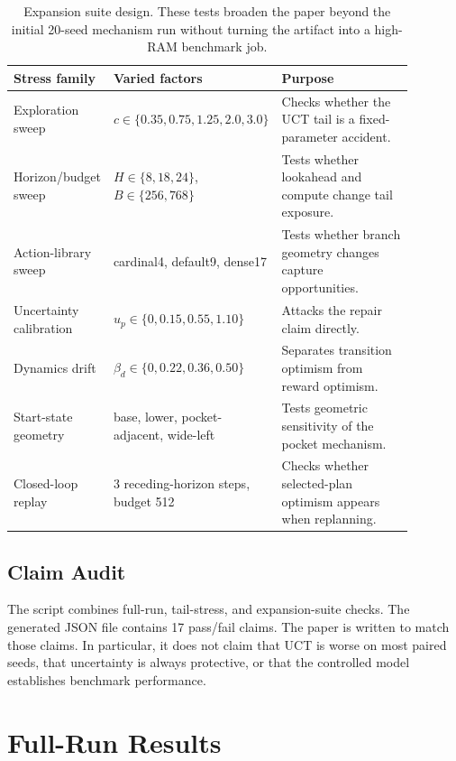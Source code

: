 \documentclass{article}
\begin{document}
\begin{table}[t]
\caption{Expansion suite design. These tests broaden the paper beyond the initial 20-seed mechanism run without turning the artifact into a high-RAM benchmark job.}
\label{tab:expansion-design}
\begin{center}
\begin{tabular}{p{0.23\linewidth}p{0.30\linewidth}p{0.35\linewidth}}
\toprule
Stress family & Varied factors & Purpose \\
\midrule
Exploration sweep & \(c\in\{0.35,0.75,1.25,2.0,3.0\}\) & Checks whether the UCT tail is a fixed-parameter accident. \\
Horizon/budget sweep & \(H\in\{8,18,24\}\), \(B\in\{256,768\}\) & Tests whether lookahead and compute change tail exposure. \\
Action-library sweep & cardinal4, default9, dense17 & Tests whether branch geometry changes capture opportunities. \\
Uncertainty calibration & \(u_p\in\{0,0.15,0.55,1.10\}\) & Attacks the repair claim directly. \\
Dynamics drift & \(\beta_d\in\{0,0.22,0.36,0.50\}\) & Separates transition optimism from reward optimism. \\
Start-state geometry & base, lower, pocket-adjacent, wide-left & Tests geometric sensitivity of the pocket mechanism. \\
Closed-loop replay & 3 receding-horizon steps, budget 512 & Checks whether selected-plan optimism appears when replanning. \\
\bottomrule
\end{tabular}
\end{center}
\end{table}

\subsection{Claim Audit}

The script  combines full-run, tail-stress, and expansion-suite checks. The generated JSON file contains 17 pass/fail claims. The paper is written to match those claims. In particular, it does not claim that UCT is worse on most paired seeds, that uncertainty is always protective, or that the controlled model establishes benchmark performance.

\section{Full-Run Results}
\end{document}
